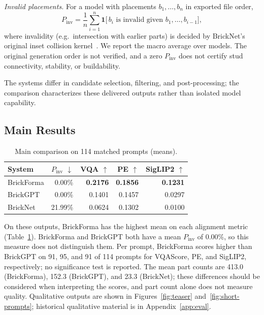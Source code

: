 \documentclass[letterpaper]{article} %
\begin{document}
\emph{Invalid placements.} For a model with placements $b_1,\ldots,b_n$ in exported file order,
\begin{equation}
P_{\mathrm{inv}} = \frac{1}{n}\sum_{i=1}^{n}\mathbf{1}\big[\,b_i \text{ is invalid given } b_1,\ldots,b_{i-1}\big],
\end{equation}
where invalidity (e.g.\ intersection with earlier parts) is decided by BrickNet's original inset collision kernel~\cite{bricknet}. We report the macro average over models. The original generation order is not verified, and a zero $P_{\mathrm{inv}}$ does not certify stud connectivity, stability, or buildability.

The systems differ in candidate selection, filtering, and post-processing; the comparison characterizes these delivered outputs rather than isolated model capability.



\subsection{Main Results}
\begin{table}[t]
\centering
\small
\setlength{\tabcolsep}{4pt}
\begin{tabular}{lrrrr}
\toprule
System & $P_{\mathrm{inv}}$ $\downarrow$ & VQA $\uparrow$ & PE $\uparrow$ & SigLIP2 $\uparrow$ \\
\midrule
BrickForma & 0.00\% & \textbf{0.2176} & \textbf{0.1856} & \textbf{0.1231} \\
BrickGPT & 0.00\% & 0.1401 & 0.1457 & 0.0297 \\
BrickNet & 21.99\% & 0.0624 & 0.1302 & 0.0100 \\
\bottomrule
\end{tabular}
\caption{Main comparison on 114 matched prompts (means).}
\label{tab:main}
\end{table}
On these outputs, BrickForma has the highest mean on each alignment metric (Table~\ref{tab:main}). BrickForma and BrickGPT both have a mean $P_{\mathrm{inv}}$ of 0.00\%, so this measure does not distinguish them. Per prompt, BrickForma scores higher than BrickGPT on 91, 95, and 91 of 114 prompts for VQAScore, PE, and SigLIP2, respectively; no significance test is reported. The mean part counts are 413.0 (BrickForma), 152.3 (BrickGPT), and 23.3 (BrickNet); these differences should be considered when interpreting the scores, and part count alone does not measure quality. Qualitative outputs are shown in Figures~\ref{fig:teaser} and~\ref{fig:short-prompts}; historical qualitative material is in Appendix~\ref{app:eval}.
\end{document}
